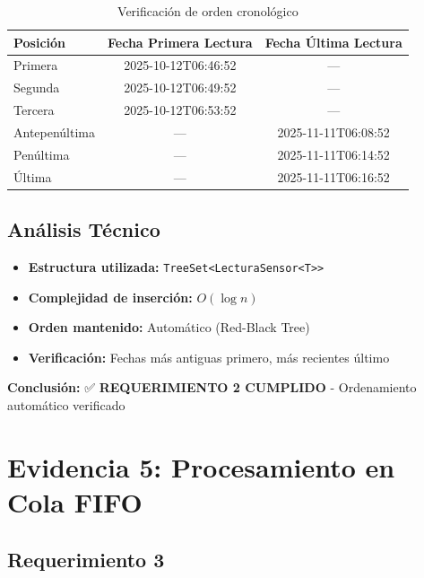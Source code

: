 \documentclass[12pt,a4paper]{article}
\begin{document}
\begin{table}[h]
\centering
\small
\begin{tabular}{|l|c|c|}
\hline
\rowcolor{evidenceblue!20}
\textbf{Posición} & \textbf{Fecha Primera Lectura} & \textbf{Fecha Última Lectura} \\
\hline
Primera & 2025-10-12T06:46:52 & --- \\
Segunda & 2025-10-12T06:49:52 & --- \\
Tercera & 2025-10-12T06:53:52 & --- \\
\hline
Antepenúltima & --- & 2025-11-11T06:08:52 \\
Penúltima & --- & 2025-11-11T06:14:52 \\
Última & --- & 2025-11-11T06:16:52 \\
\hline
\end{tabular}
\caption{Verificación de orden cronológico}
\label{tab:ordenamiento}
\end{table}

\subsection{Análisis Técnico}

\begin{itemize}
    \item \textbf{Estructura utilizada:} \texttt{TreeSet<LecturaSensor<T>>}
    \item \textbf{Complejidad de inserción:} $O(\log n)$
    \item \textbf{Orden mantenido:} Automático (Red-Black Tree)
    \item \textbf{Verificación:} Fechas más antiguas primero, más recientes último
\end{itemize}

\textbf{Conclusión:} ✅ \textbf{REQUERIMIENTO 2 CUMPLIDO} - Ordenamiento automático verificado


\section{Evidencia 5: Procesamiento en Cola FIFO}

\subsection{Requerimiento 3}
\end{document}

